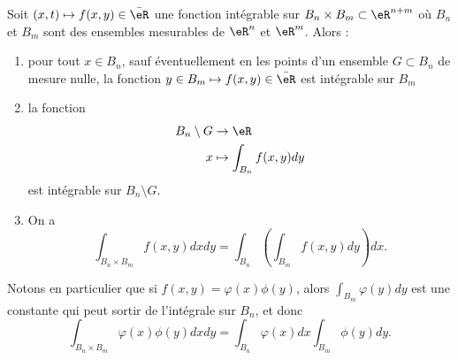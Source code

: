 \begin{theorem}[Fubini]\label{ThoFubini}
Soit $(x,t)\mapsto f(x,y)\in\bar \eR$ une fonction intégrable sur $B_n\times B_m\subset\eR^{n+m}$ où $B_n$ et $B_m$ sont des ensembles mesurables de $\eR^n$ et $\eR^m$. Alors :
\begin{enumerate}
\item pour tout $x\in B_n$, sauf éventuellement en les points d'un ensemble $G\subset B_n$ de mesure nulle, la fonction $y\in B_m\mapsto f(x,y)\in\bar\eR$ est intégrable sur $B_m$
\item
la fonction
\begin{equation}
    \begin{aligned}
        B_n\setminus G&\to \eR \\
        x&\mapsto \int_{B_n}f(x,y)dy
    \end{aligned}
\end{equation}
est intégrable sur $B_n\setminus G$.
\item
On a
\begin{equation}
	\int_{B_n\times B_m}f(x,y)dxdy=\int_{B_n}\left( \int_{B_m}f(x,y)dy \right)dx.
\end{equation}

\end{enumerate}
\end{theorem}

Notons en particulier que si $f(x,y)=\varphi(x)\phi(y)$, alors $\int_{B_m}\varphi(y)dy$ est une constante qui peut sortir de l'intégrale sur $B_n$, et donc
\begin{equation}		\label{EqFubiniFactori}
	\int_{B_n\times B_m}\varphi(x)\phi(y)dxdy=\int_{B_n}\varphi(x)dx\int_{B_m}\phi(y)dy.
\end{equation}

